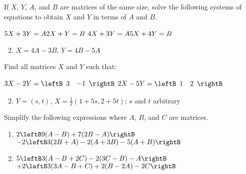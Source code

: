 \begin{multicols}{2}
\begin{ex}
If $X$, $Y$, $A$, and $B$ are matrices of the same size, solve the following systems of equations to obtain $X$ and $Y$ in terms of $A$ and $B$.
\begin{exenumerate}
\exitem 
$5X + 3Y = A \\
2X + Y = B$
\exitem 
$4X + 3Y = A \\
5X + 4Y = B$
\end{exenumerate}
\begin{sol}
\begin{enumerate}[label={\alph*.}]
\setcounter{enumi}{1}
\item  $X = 4A - 3B$, $Y = 4B - 5A$

\end{enumerate}
\end{sol}
\end{ex}

\begin{ex}
Find all matrices $X$ and $Y$ such that:

\begin{exenumerate}
\exitem $3X - 2Y = \leftB \begin{array}{rr}
3 & - 1 
\end{array} \rightB$
\exitem $2X - 5Y = \leftB \begin{array}{rr}
1 & 2
\end{array} \rightB$
\end{exenumerate}
\begin{sol}
\begin{enumerate}[label={\alph*.}]
\setcounter{enumi}{1}
\item  $Y = (s, t)$, $X = \frac{1}{2}(1 + 5s, 2 + 5t)$; $s$ and $t$ arbitrary

\end{enumerate}
\end{sol}
\end{ex}

\begin{ex}
Simplify the following expressions where $A$, $B$, and $C$ are matrices.

\begin{enumerate}[label={\alph*.}]
\item $2 \leftB 9(A - B) + 7(2B - A) \rightB$ \\ $- 2 \leftB 3(2B + A) - 2(A + 3B) - 5(A + B) \rightB$

\item $5 \leftB 3(A - B + 2C) - 2(3C - B) - A \rightB$  \\ $+ 2 \leftB 3(3A - B + C) + 2(B - 2A) - 2C \rightB$


\end{enumerate}
\end{ex}
\end{multicols}
